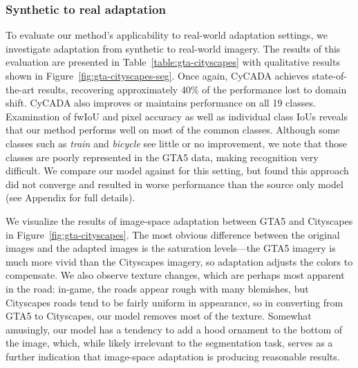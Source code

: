 \subsubsection{Synthetic to real adaptation}

To evaluate our method's applicability to real-world adaptation settings, we investigate adaptation from synthetic to real-world imagery.
The results of this evaluation are presented in Table~\ref{table:gta-cityscapes} with qualitative results shown in Figure~\ref{fig:gta-cityscapes-seg}.
Once again, CyCADA achieves state-of-the-art results, recovering approximately 40\% of the performance lost to domain shift.
CyCADA also improves or maintains performance on all 19 classes.
Examination of fwIoU and pixel accuracy as well as individual class IoUs reveals that our method performs well on most of the common classes.
Although some classes such as \emph{train} and \emph{bicycle} see little or no improvement, we note that those classes are poorly represented in the GTA5 data, making recognition very difficult. We compare our model against \citet{shrivastava_cvpr17} for this setting, but found this approach did not converge and resulted in worse performance than the source only model (see Appendix for full details).

We visualize the results of image-space adaptation between GTA5 and Cityscapes in Figure~\ref{fig:gta-cityscapes}.
The most obvious difference between the original images and the adapted images is the saturation levels---the GTA5 imagery is much more vivid than the Cityscapes imagery, so adaptation adjusts the colors to compensate.
We also observe texture changes, which are perhaps most apparent in the road: in-game, the roads appear rough with many blemishes, but Cityscapes roads tend to be fairly uniform in appearance, so in converting from GTA5 to Cityscapes, our model removes most of the texture.
Somewhat amusingly, our model has a tendency to add a hood ornament to the bottom of the image, which, while likely irrelevant to the segmentation task, serves as a further indication that image-space adaptation is producing reasonable results.
